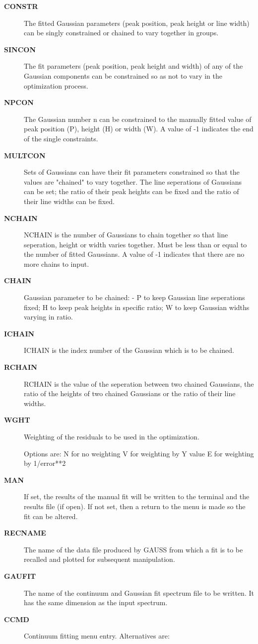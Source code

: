 \begin{description}
\begin{description}
\item [{\bf CONSTR}]
 The fitted Gaussian parameters (peak position, peak height or line
 width) can be singly constrained or chained to vary together in
 groups.
\item [{\bf SINCON}]
 The fit parameters (peak position, peak height and width) of any of
 the Gaussian components can be constrained so as not to vary in the
 optimization process.
\item [{\bf NPCON}]
 The Gaussian number n can be constrained to the manually fitted value
 of peak position (P), height (H) or width (W).  A value of -1
 indicates the end of the single constraints.
\item [{\bf MULTCON}]
 Sets of Gaussians can have their fit parameters constrained so that
 the values are "chained" to vary together. The line seperations of
 Gaussians can be set; the ratio of their peak heights can be fixed
 and the ratio of their line widths can be fixed.
\item [{\bf NCHAIN}]
 NCHAIN is the number of Gaussians to chain together so that line
 seperation, height or width varies together. Must be less than or
 equal to the number of fitted Gaussians. A value of -1 indicates that
 there are no more chains to input.
\item [{\bf CHAIN}]
 Gaussian parameter to be chained: - P to keep Gaussian line
 seperations fixed; H to keep peak heights in specific ratio; W to
 keep Gaussian widths varying in ratio.
\item [{\bf ICHAIN}]
 ICHAIN is the index number of the Gaussian which is to be chained.
\item [{\bf RCHAIN}]
 RCHAIN is the value of the seperation between two chained Gaussians,
 the ratio of the heights of two chained Gaussians or the ratio of
 their line widths.
\item [{\bf WGHT}]
 Weighting of the residuals to be used in the optimization.

 Options are: N for no weighting
              V for weighting by Y value
              E for weighting by 1/error**2
\item [{\bf MAN}]
 If set, the results of the manual fit will be written to the
 terminal and the results file (if open).  If not set, then a
 return to the menu is made so the fit can be altered.
\item [{\bf RECNAME}]
 The name of the data file produced by GAUSS from which a
 fit is to be recalled and plotted for subsequent manipulation.
\item [{\bf GAUFIT}]
 The name of the continuum and Gaussian fit spectrum file to
 be written. It has the same dimension as the input spectrum.
\item [{\bf CCMD}]
 Continuum fitting menu entry. Alternatives are:


\end{description}
\end{description}
